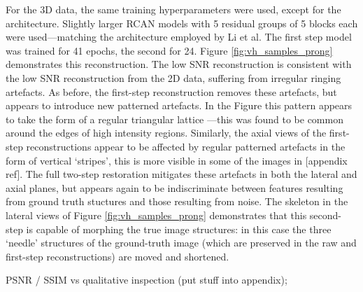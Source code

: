 \documentclass[12pt]{article}
\begin{document}
For the 3D data, the same training hyperparameters were used, except for the architecture.
Slightly larger RCAN models with 5 residual groups of 5 blocks each were used---matching the architecture employed by Li et al.
The first step model was trained for 41 epochs, the second for 24.
Figure \ref{fig:vh_samples_prong} demonstrates this reconstruction.
The low SNR reconstruction is consistent with the low SNR reconstruction from the 2D data,
suffering from irregular ringing artefacts.
As before, the first-step reconstruction removes these artefacts,
but appears to introduce new patterned artefacts.
In the Figure this pattern appears to take the form of a regular triangular lattice
---this was found to be common around the edges of high intensity regions.
Similarly, the axial views of the first-step reconstructions appear to be affected by regular patterned artefacts in the form of vertical `stripes',
this is more visible in some of the images in [appendix ref].
The full two-step restoration mitigates these artefacts in both the lateral and axial planes,
but appears again to be indiscriminate between features resulting from ground truth stuctures and those resulting from noise.
The skeleton in the lateral views of Figure \ref{fig:vh_samples_prong} demonstrates that this second-step is capable of morphing the true image structures:
in this case the three `needle' structures of the ground-truth image (which are preserved in the raw and first-step reconstructions) are moved and shortened.


PSNR / SSIM vs qualitative inspection (put stuff into appendix);
\end{document}
